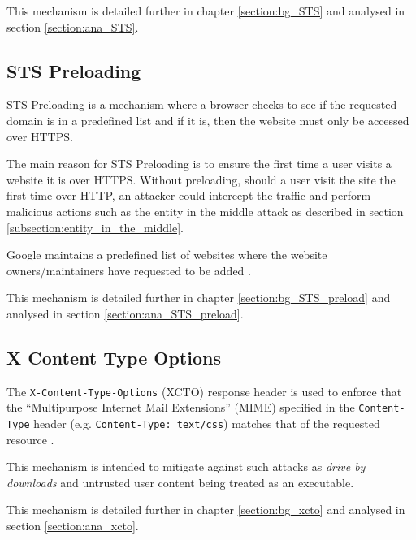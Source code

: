 \documentclass{mscreport}
\begin{document}
\vspace{0.3cm} \noindent
This mechanism is detailed further in chapter \ref{section:bg_STS} and analysed in section \ref{section:ana_STS}.


\subsection{STS Preloading}
STS Preloading is a mechanism where a browser checks to see if the requested domain is in a predefined list and if it is, then the website must only be accessed over HTTPS.

\vspace{0.3cm} \noindent
The main reason for STS Preloading is to ensure the first time a user visits a website it is over HTTPS. Without preloading, should a user visit the site the first time over HTTP, an attacker could intercept the traffic and perform malicious actions such as the entity in the middle attack as described in section \ref{subsection:entity_in_the_middle}.

\vspace{0.3cm} \noindent
Google maintains a predefined list of websites where the website owners/maintainers have requested to be added \cite{Hodges2012-pe}.

\vspace{0.3cm} \noindent
This mechanism is detailed further in chapter \ref{section:bg_STS_preload} and analysed in section \ref{section:ana_STS_preload}.


\subsection{X Content Type Options}
The \texttt{X-Content-Type-Options} (XCTO) response header is used to enforce that the ``Multipurpose Internet Mail Extensions'' (MIME) specified in the \texttt{Content-Type} header (e.g. \newline 
\texttt{Content-Type: text/css}) matches that of the requested resource \cite{Apple_undated-hz}.

\vspace{0.3cm} \noindent
This mechanism is intended to mitigate against such attacks as \textit{drive by downloads} and untrusted user content being treated as an executable.

\vspace{0.3cm} \noindent
This mechanism is detailed further in chapter \ref{section:bg_xcto} and analysed in section \ref{section:ana_xcto}.
\end{document}
